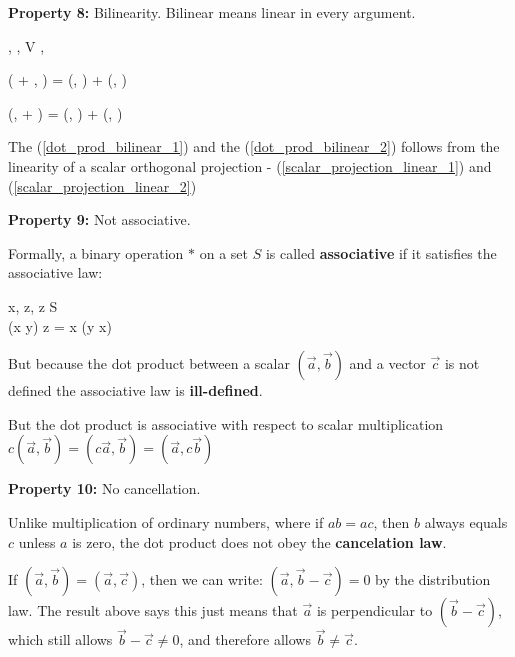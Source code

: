 \documentclass{article}
\begin{document}
\textbf{Property 8:} Bilinearity. Bilinear means linear in every argument.

\beqn
\forall {}, ,  \in V  \forall \lambda, \mu \in {}
\eeq

\beq \label{dot_prod_bilinear_1}
(\lambda {} + \mu {}, ) = \lambda (, ) + 
\mu (, )
\eeq

\beq \label{dot_prod_bilinear_2}
(, \lambda {} + \mu {}) = \lambda (, ) + \mu (, )
\eeq

The (\ref{dot_prod_bilinear_1}) and the (\ref{dot_prod_bilinear_2}) follows from the linearity of a scalar orthogonal projection - (\ref{scalar_projection_linear_1}) and (\ref{scalar_projection_linear_2})





\textbf{Property 9:} Not associative.

Formally, a binary operation $\ast$ on a set $S$ is called \textbf{associative} if it satisfies the associative law:

\beq \label{associative_law}
\forall x, z, z  S \\
(x \ast y) \ast z = x \ast (y \ast x)
\eeq

But because the dot product between a scalar $(\vec{a}, \vec{b})$ and a vector $\vec{c}$ is not defined the associative law is \textbf{ill-defined}.

But the dot product is associative with respect to scalar multiplication $c (\vec{a}, \vec{b}) = 
(c \vec{a}, \vec{b}) = (\vec{a}, c \vec{b})$



\textbf{Property 10:} No cancellation.

Unlike multiplication of ordinary numbers, where if $ab = ac$, then $b$ always equals $c$ unless $a$ is zero, the dot product does not obey the \textbf{cancelation law}.

If $(\vec{a}, \vec{b}) = (\vec{a}, \vec{c})$, then we can write: 
$(\vec{a}, \vec{b} - \vec{c}) = 0$ by the distribution law. The result above says this just means that $\vec{a}$ is perpendicular to $(\vec{b} - \vec{c})$, which still allows $\vec{b} - \vec{c} \neq 0$, and therefore allows $\vec{b} \neq \vec{c}$.
\end{document}

